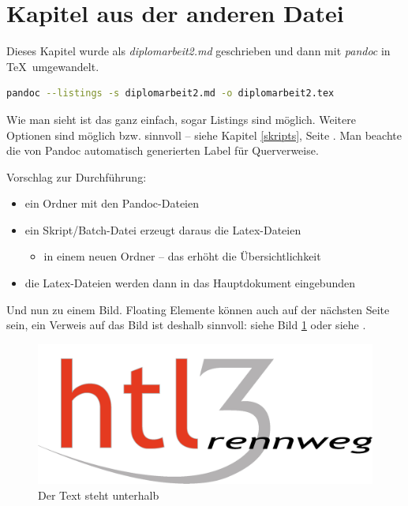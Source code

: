 \hypertarget{kapitel-aus-der-anderen-datei}{%
\section{Kapitel aus der anderen
Datei}\label{kapitel-aus-der-anderen-datei}}

Dieses Kapitel wurde als \emph{diplomarbeit2.md} geschrieben und dann
mit \emph{pandoc} in \TeX~umgewandelt.

\begin{lstlisting}[language=bash]
pandoc --listings -s diplomarbeit2.md -o diplomarbeit2.tex 
\end{lstlisting}

Wie man sieht ist das ganz einfach, sogar Listings sind möglich. Weitere
Optionen sind möglich bzw. sinnvoll -- siehe Kapitel \ref{skripts},
Seite \pageref{skripts}. Man beachte die von Pandoc automatisch
generierten Label für Querverweise.

Vorschlag zur Durchführung:

\begin{itemize}
\tightlist
\item
  ein Ordner mit den Pandoc-Dateien
\item
  ein Skript/Batch-Datei erzeugt daraus die Latex-Dateien

  \begin{itemize}
  \tightlist
  \item
    in einem neuen Ordner -- das erhöht die Übersichtlichkeit
  \end{itemize}
\item
  die Latex-Dateien werden dann in das Hauptdokument eingebunden
\end{itemize}

Und nun zu einem Bild. Floating Elemente können auch auf der nächsten
Seite sein, ein Verweis auf das Bild ist deshalb sinnvoll: siehe Bild
\ref{Bild1} oder siehe .

\begin{figure}
\centering
\includegraphics{HTL3RLogo.png}
\caption{Der Text steht unterhalb\label{Bild1}}
\end{figure}

